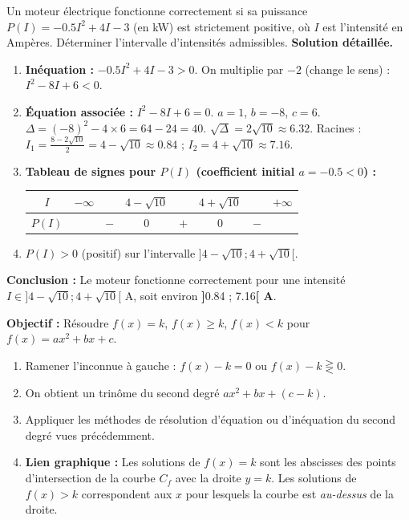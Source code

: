 \documentclass[11pt]{article}
\begin{document}
\begin{exoresolu}
    Un moteur électrique fonctionne correctement si sa puissance $P(I) = -\num{0,5}I^2 + 4I - 3$ (en kW) est strictement positive, où $I$ est l'intensité en Ampères. Déterminer l'intervalle d'intensités admissibles.
    \tcblower
    \textbf{Solution détaillée.}
    \begin{enumerate}
        \item \textbf{Inéquation :} $-\num{0,5}I^2 + 4I - 3 > 0$. On multiplie par $-2$ (change le sens) : $I^2 - 8I + 6 < 0$.
        \item \textbf{Équation associée :} $I^2 - 8I + 6 = 0$. $a=1$, $b=-8$, $c=6$.
        $\Delta = (-8)^2 - 4\times6 = 64 - 24 = 40$. $\sqrt{\Delta} = 2\sqrt{10} \approx \num{6,32}$.
        Racines : $I_1 = \frac{8 - 2\sqrt{10}}{2} = 4 - \sqrt{10} \approx \num{0,84}$ ; $I_2 = 4 + \sqrt{10} \approx \num{7,16}$.
        \item \textbf{Tableau de signes pour $P(I)$ (coefficient initial $a=-\num{0,5} < 0$) :}
        \begin{center}
        \begin{tabular}{|c|ccccccc|}\hline
        $I$ & $-\infty$ & & $4-\sqrt{10}$ & & $4+\sqrt{10}$ & & $+\infty$ \\ \hline
        $P(I)$ & & $-$ & $0$ & $+$ & $0$ & $-$ & \\ \hline
        \end{tabular}
        \end{center}
        \item $P(I) > 0$ (positif) sur l'intervalle $]4-\sqrt{10} ; 4+\sqrt{10}[$.
    \end{enumerate}
    \textbf{Conclusion :} Le moteur fonctionne correctement pour une intensité $I \in ]4-\sqrt{10} ; 4+\sqrt{10}[$ A, soit environ \textbf{]}\num{0,84} ; \num{7,16}\textbf{[ A}.
\end{exoresolu}

\begin{methode}
    \textbf{Objectif :} Résoudre $f(x)=k$, $f(x) \ge k$, $f(x) < k$ pour $f(x)=ax^2+bx+c$.
    \begin{enumerate}
        \item Ramener l'inconnue à gauche : $f(x) - k = 0$ ou $f(x) - k \gtreqless 0$.
        \item On obtient un trinôme du second degré $ax^2+bx+(c-k)$.
        \item Appliquer les méthodes de résolution d'équation ou d'inéquation du second degré vues précédemment.
        \item \textbf{Lien graphique :} Les solutions de $f(x)=k$ sont les abscisses des points d'intersection de la courbe $C_f$ avec la droite $y=k$. Les solutions de $f(x) > k$ correspondent aux $x$ pour lesquels la courbe est \emph{au-dessus} de la droite.
    \end{enumerate}
\end{methode}
\end{document}
